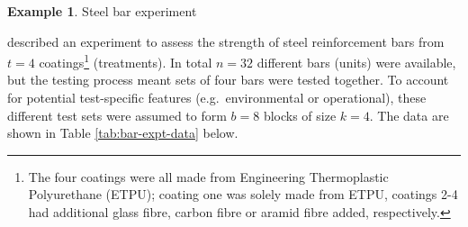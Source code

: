 \documentclass[
]{book}
\theoremstyle{definition}
\theoremstyle{definition}
\newtheorem{example}{Example}[chapter]
\theoremstyle{definition}
\theoremstyle{definition}
\theoremstyle{remark}
\begin{document}
\begin{example}
\protect\hypertarget{exm:blocks-bars}{}\label{exm:blocks-bars}Steel bar experiment \citep[ch.~4]{Morris2011}

\citet{KSN2005} described an experiment to assess the strength of steel reinforcement bars from \(t=4\) coatings\footnote{The four coatings were all made from Engineering Thermoplastic Polyurethane (ETPU); coating one was solely made from ETPU, coatings 2-4 had additional glass fibre, carbon fibre or aramid fibre added, respectively.} (treatments). In total \(n=32\) different bars (units) were available, but the testing process meant sets of four bars were tested together. To account for potential test-specific features (e.g.~environmental or operational), these different test sets were assumed to form \(b=8\) blocks of size \(k=4\). The data are shown in Table \ref{tab:bar-expt-data} below.


\end{example}
\end{document}
